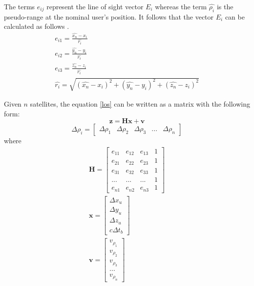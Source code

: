 The terms $e_{ij}$ represent the line of sight vector $E_i$ whereas the term $\hat{\rho_i}$ is the pseudo-range at the nominal user's position. It follows that the vector $E_i$ can be calculated as follows \cite{jwo2001efficient}.
\begin{subequations}
	\begin{align}
		e_{i1} = \frac{\hat{x_n} - x_i}{\hat{r_i}}\\
		e_{i2} = \frac{\hat{y_n} - y_i}{\hat{r_i}}\\
		e_{i3} = \frac{\hat{z_n} - z_i}{\hat{r_i}}\\
		\hat{r_i} = \sqrt{(\hat{x_n} - x_i)^2+(\hat{y_n} -y_i)^2+(\hat{z_n} -z_i)^2}
	\end{align}
\end{subequations}

Given $n$ satellites, the equation \eqref{los} can be written as a matrix with the following form:
\begin{equation}
	\textbf{z} = \textbf{Hx}+ \textbf{v}
\end{equation}
\begin{equation}
	\Delta \rho _i = \begin{bmatrix}
		\Delta \rho_1 &  \Delta \rho_2 &  \Delta \rho_3 & ... & \Delta \rho_n
	\end{bmatrix} 
\end{equation}
where 
\begin{subequations}
	\begin{align}
		\textbf{H} = \begin{bmatrix}
			e_{11} & e_{12} & e_{13}& 1 \\
			e_{21} & e_{22} & e_{23}& 1 
			\\
			e_{31} & e_{32} & e_{33}& 1
			\\
			... & ... & ... &  1 
			\\
			e_{n1} & e_{n2} & e_{n3} & 1
		\end{bmatrix}\\
		\textbf{x} = \begin{bmatrix}
			\Delta x_u \\ \Delta y_u \\\Delta z_u \\ c\Delta t_b
		\end{bmatrix}\\
		\textbf{v} = \begin{bmatrix}
			v_{\rho_1}\\
			v_{\rho_2}\\
			v_{\rho_3}\\
			...\\
			v_{\rho_n}
		\end{bmatrix}
	\end{align}
\end{subequations}

